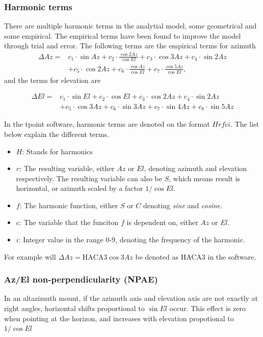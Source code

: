 \subsubsection{Harmonic terms}
There are multiple harmonic terms in the analytial model, some geometrical and some empirical.
The empirical terms have been found to improve the model through trial and error.
The following terms are the empirical terms for azimuth
\begin{align}
    \Delta Az =&  c_1 \cdot \sin{Az} + c_2 \cdot \frac{\cos{2Az}}{\cos{El}} + c_3 \cdot \cos{3Az} + c_4 \cdot \sin{2Az} \\
    &+ c_5 \cdot \cos{2Az} + c_6 \cdot \frac{\cos{Az}}{\cos{El}} + c_7 \cdot \frac{\cos{5Az}}{\cos{El}},
\end{align}
and the terms for elevation are

\begin{align}
    \Delta El =&  c_1 \cdot \sin{El} + c_2 \cdot \cos{El}+ c_3 \cdot \cos{2Az} + c_4 \cdot \sin{2Az} \\
    &+ c_5 \cdot \cos{3Az} + c_6 \cdot \sin{3Az} + c_7 \cdot \sin{4Az} + c_8 \cdot \sin{5Az}  
\end{align}


In the tpoint software, harmonic terms are denoted on the format $Hrfci$. The list below explain the different terms.
\begin{itemize}
    \item $H$: Stands for harmonics
    \item $r$: The resulting variable, either $Az$ or $El$, denoting azimuth and elevation respectively.
    The resulting variable can also be $S$, which means result is horizontal, or azimuth scaled by a factor $1/\cos{El}$.
    \item $f$: The harmonic function, either $S$ or $C$ denoting \textit{sine} and \textit{cosine}.
    \item $c$: The variable that the funciton $f$ is dependent on, either $Az$ or $El$.
    \item $i$: Integer value in the range $0$-$9$, denoting the frequency of the harmonic.
\end{itemize}

For example will $\Delta Az = \text{HACA3}\cos{3Az}$ be denoted as HACA3 in the software.

\subsubsection{Az/El non-perpendicularity (NPAE)}
In an altazimuth mount, if the azimuth axis and elevation axis are not exactly at
right angles, horizontal shifts proportional to $\sin{El}$ occur. This effect is zero when pointing at the horizon, and increases with elevation propotional to $1/\cos{El}$


